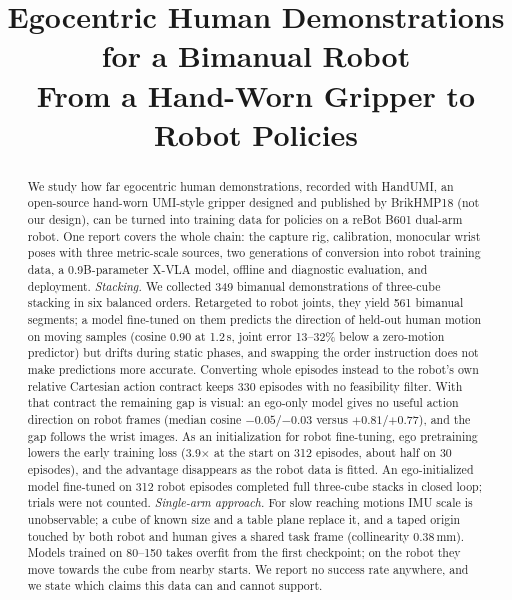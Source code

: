 \documentclass[conference,10pt]{IEEEtran}
\newcommand{\mm}{\,mm\xspace}
\begin{document}
\title{Egocentric Human Demonstrations\\for a Bimanual Robot\\[1mm]\Large From a Hand-Worn Gripper to Robot Policies}
\author{
}
\maketitle

\begin{abstract}
We study how far egocentric human demonstrations, recorded with HandUMI, an open-source hand-worn UMI-style gripper designed
and published by BrikHMP18 (not our design), can be turned into training data for policies on a reBot B601 dual-arm robot.
One report covers the whole chain: the capture rig, calibration, monocular wrist poses with three metric-scale sources,
two generations of conversion into robot training data, a 0.9B-parameter X-VLA model, offline and diagnostic evaluation,
and deployment. \emph{Stacking.} We collected 349 bimanual demonstrations of three-cube stacking in six balanced orders.
Retargeted to robot joints, they yield 561 bimanual segments; a model fine-tuned on them predicts the direction of held-out
human motion on moving samples (cosine 0.90 at 1.2\,s, joint error 13--32\% below a zero-motion predictor) but drifts
during static phases, and swapping the order instruction does not make predictions more accurate. Converting whole episodes
instead to the robot's own relative Cartesian action contract keeps 330 episodes with no feasibility filter. With that
contract the remaining gap is visual: an ego-only model gives no useful action direction on robot frames (median cosine
$-0.05$/$-0.03$ versus $+0.81$/$+0.77$), and the gap follows the wrist images. As an initialization for robot fine-tuning,
ego pretraining lowers the early training loss (3.9$\times$ at the start on 312 episodes, about half on 30 episodes), and
the advantage disappears as the robot data is fitted. An ego-initialized model fine-tuned on 312 robot episodes completed
full three-cube stacks in closed loop; trials were not counted. \emph{Single-arm approach.} For slow reaching motions IMU
scale is unobservable; a cube of known size and a table plane replace it, and a taped origin touched by both robot and human
gives a shared task frame (collinearity 0.38\mm). Models trained on 80--150 takes overfit from the first checkpoint; on the
robot they move towards the cube from nearby starts. We report no success rate anywhere, and we state which claims this
data can and cannot support.
\end{abstract}
\end{document}
